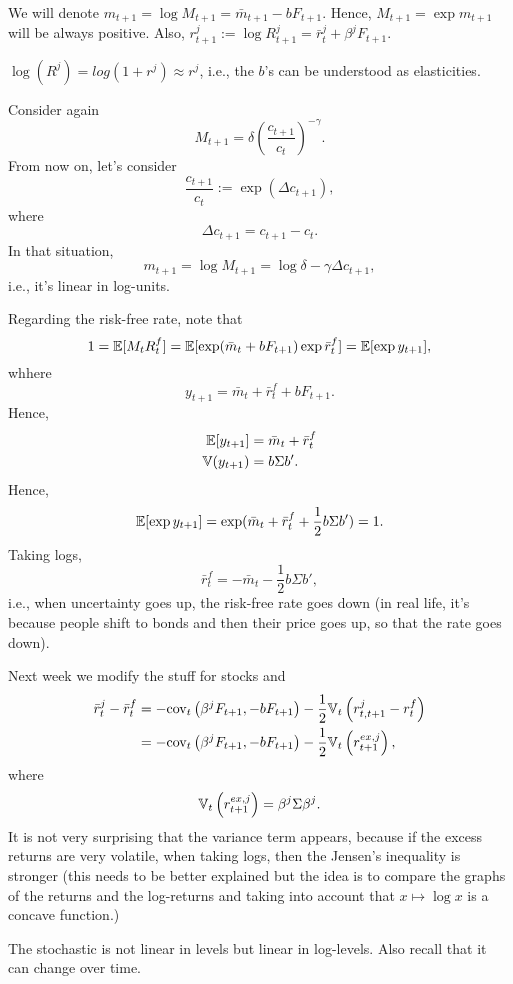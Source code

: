 We will denote $m_{t+1} = \log M_{t+1} = \bar{m}_{t+1}-b F_{t+1}$. Hence, $M_{t+1} = \exp m_{t+1}$ will be always positive. Also, $r_{t+1}^j := \log R_{t+1}^j = \bar{r}_t^j + \beta^j F_{t+1}$. 

\note $\log(R^j) = log(1+r^j)\approx r^j$, i.e., the $b$'s can be understood as elasticities.

\begin{example}
	Consider again
	$$
		M_{t+1} = \delta \left(\frac{c_{t+1}}{c_t}\right)^{-\gamma}.
	$$
	From now on, let's consider
	$$
		\frac{c_{t+1}}{c_t} := \exp\left(\Delta c_{t+1}\right),
	$$
	where
	$$
		\Delta c_{t+1}= c_{t+1}-c_t.
	$$
	In that situation,
	$$
		m_{t+1} = \log M_{t+1} = \log \delta - \gamma \Delta c_{t+1},
	$$
	i.e., it's linear in log-units.
\end{example}

Regarding the risk-free rate, note that
$$
	1 = \mathbb{E}[M_tR_t^f] = \mathbb{E}[\exp(\bar{m}_t+b F_{t+1})\exp \bar{r}_t^f] = \mathbb{E}[\exp y_{t+1}],
$$
whhere 
$$
	y_{t+1} = \bar{m}_t + \bar{r}_t^f + b F_{t+1}.
$$
Hence, 
$$
	\begin{aligned}
		\mathbb{E}[y_{t+1}] & = \bar{m}_{t} + \bar{r}_t^f\\
		\mathbb{V}(y_{t+1}) & = b \Sigma b'.
	\end{aligned}
$$
Hence, 
$$
	\mathbb{E}[\exp y_{t+1}] = \exp(\bar{m}_t + \bar{r}_t^f + \frac{1}{2}b\Sigma b') = 1. 
$$
Taking logs,
$$
	\bar{r}_t^f = -\bar{m}_t - \frac{1}{2}b\Sigma b',
$$
i.e., when uncertainty goes up, the risk-free rate goes down (in real life, it's because people shift to bonds and then their price goes up, so that the rate goes down).

Next week we modify the stuff for stocks and
$$
	\begin{aligned}
		\bar{r}_t^j - \bar{r}_t^f &= -\text{cov}_t\left(\beta^j F_{t+1}, -bF_{t+1}\right) - \frac{1}{2}\mathbb{V}_t\left(r_{t,t+1}^j - r_t^f\right)\\
		&=  -\text{cov}_t\left(\beta^j F_{t+1}, -bF_{t+1}\right) - \frac{1}{2}\mathbb{V}_t\left(r^{ex,j}_{t+1}\right),
	\end{aligned}
$$
where 
$$
	\mathbb{V}_t\left(r^{ex,j}_{t+1}\right) = \beta^j \Sigma \beta^j.
$$
It is not very surprising that the variance term appears, because if the excess returns are very volatile, when taking logs, then the Jensen's inequality is stronger (this needs to be better explained but the idea is to compare the graphs of the returns and the log-returns and taking into account that $x\mapsto \log x$ is a concave function.)

\note The stochastic is not linear in levels but linear in log-levels. Also recall that it can change over time.